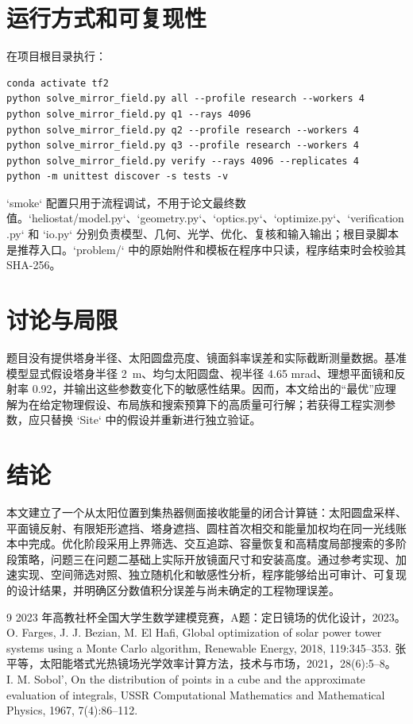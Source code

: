 \documentclass[UTF8,a4paper,11pt]{ctexart}
\begin{document}
\section{运行方式和可复现性}
在项目根目录执行：
\begin{verbatim}
conda activate tf2
python solve_mirror_field.py all --profile research --workers 4
python solve_mirror_field.py q1 --rays 4096
python solve_mirror_field.py q2 --profile research --workers 4
python solve_mirror_field.py q3 --profile research --workers 4
python solve_mirror_field.py verify --rays 4096 --replicates 4
python -m unittest discover -s tests -v
\end{verbatim}
`smoke` 配置只用于流程调试，不用于论文最终数值。`heliostat/model.py`、`geometry.py`、`optics.py`、`optimize.py`、`verification.py` 和 `io.py` 分别负责模型、几何、光学、优化、复核和输入输出；根目录脚本是推荐入口。`problem/` 中的原始附件和模板在程序中只读，程序结束时会校验其 SHA-256。

\section{讨论与局限}
题目没有提供塔身半径、太阳圆盘亮度、镜面斜率误差和实际截断测量数据。基准模型显式假设塔身半径 \SI{2}{m}、均匀太阳圆盘、视半径 4.65 mrad、理想平面镜和反射率 0.92，并输出这些参数变化下的敏感性结果。因而，本文给出的“最优”应理解为在给定物理假设、布局族和搜索预算下的高质量可行解；若获得工程实测参数，应只替换 `Site` 中的假设并重新进行独立验证。

\section{结论}
本文建立了一个从太阳位置到集热器侧面接收能量的闭合计算链：太阳圆盘采样、平面镜反射、有限矩形遮挡、塔身遮挡、圆柱首次相交和能量加权均在同一光线账本中完成。优化阶段采用上界筛选、交互追踪、容量恢复和高精度局部搜索的多阶段策略，问题三在问题二基础上实际开放镜面尺寸和安装高度。通过参考实现、加速实现、空间筛选对照、独立随机化和敏感性分析，程序能够给出可审计、可复现的设计结果，并明确区分数值积分误差与尚未确定的工程物理误差。

\begin{thebibliography}{9}
 2023 年高教社杯全国大学生数学建模竞赛，A题：定日镜场的优化设计，2023。
 O. Farges, J. J. Bezian, M. El Hafi, Global optimization of solar power tower systems using a Monte Carlo algorithm, Renewable Energy, 2018, 119:345--353.
 张平等，太阳能塔式光热镜场光学效率计算方法，技术与市场，2021，28(6):5--8。
 I. M. Sobol', On the distribution of points in a cube and the approximate evaluation of integrals, USSR Computational Mathematics and Mathematical Physics, 1967, 7(4):86--112.
\end{thebibliography}
\end{document}

